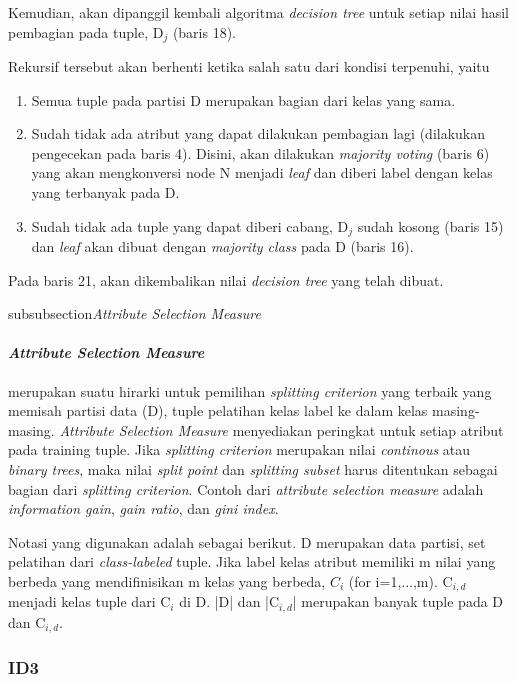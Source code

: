 Kemudian, akan dipanggil kembali algoritma \textsl{decision tree} untuk setiap nilai hasil pembagian pada tuple, D$_{j}$  (baris 18).

Rekursif tersebut akan berhenti ketika salah satu dari kondisi terpenuhi, yaitu

\begin{enumerate}
	\item Semua tuple pada partisi D merupakan bagian dari kelas yang sama.
	\item Sudah tidak ada atribut yang dapat dilakukan pembagian lagi (dilakukan pengecekan pada baris 4). Disini, akan dilakukan \textsl{majority voting} (baris 6) yang akan mengkonversi node N menjadi \textsl{leaf} dan diberi label dengan kelas yang terbanyak pada D.
	\item Sudah tidak ada tuple yang dapat diberi cabang, D$_{j}$ sudah kosong (baris 15) dan \textsl{leaf} akan dibuat dengan \textsl{majority class} pada D (baris 16).
\end{enumerate}

Pada baris 21, akan dikembalikan nilai \textsl{decision tree} yang telah dibuat.

subsubsection{\textsl{Attribute Selection Measure}}

\paragraph{\textsl{Attribute Selection Measure}} merupakan suatu hirarki untuk pemilihan \textsl{splitting criterion} yang terbaik yang memisah partisi data (D), tuple pelatihan kelas label ke dalam kelas masing-masing. \textsl{Attribute Selection Measure} menyediakan peringkat untuk setiap atribut pada training tuple. Jika \textsl{splitting criterion} merupakan nilai \textsl{continous} atau \textsl{binary trees}, maka nilai \textsl{split point} dan \textsl{splitting subset} harus ditentukan sebagai bagian dari \textsl{splitting criterion}. Contoh dari \textsl{attribute selection measure} adalah \textsl{information gain}, \textsl{gain ratio}, dan \textsl{gini index}.

Notasi yang digunakan adalah sebagai berikut. D merupakan data partisi, set pelatihan dari \textsl{class-labeled} tuple. Jika label kelas atribut memiliki m nilai yang berbeda yang mendifinisikan m kelas yang berbeda, $C_{i}$ (for i=1,...,m). C$_{i,d}$ menjadi kelas tuple dari C$_{i}$ di D. |D| dan |C$_{i,d}$| merupakan banyak tuple pada D dan C$_{i,d}$.

\subsubsection{ID3}

